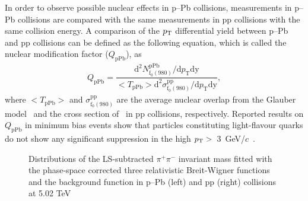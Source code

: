 \documentclass[ALICE,manyauthors]{cernphprep}
\begin{document}
In order to observe possible nuclear effects in p--Pb collisions, measurements in p--Pb collisions are compared with the same measurements in pp collisions with the same collision energy. A comparison of the $p_{\rm{T}}$ differential yield between p--Pb and pp collisions can be defined as the following equation, which is called the nuclear modification factor ($Q_{\mathrm{pPb}}$), as
\begin{eqnarray}
Q_{\mathrm{pPb}} = \dfrac{\mathrm{d}^{2} N_{\mathrm{f}_{0}(980)}^{\mathrm{pPb}} / \mathrm{d} p_{\mathrm{T}} \mathrm{dy} }{ <T_{\mathrm{pPb}}> \mathrm{d}^{2} \sigma_{\mathrm{f}_{0}(980)}^{\mathrm{pp}}/ \mathrm{d} p_{\mathrm{T}} \mathrm{dy} },
\end{eqnarray}
where $<T_{\mathrm{pPb}}>$ and $\sigma_{\mathrm{f}_{0}(980)}^{\mathrm{pp}}$ are the average nuclear overlap from the Glauber model~\cite{Miller:2007ri} and the cross section of \fzero~in pp collisions, respectively. Reported results on $Q_{\mathrm{pPb}}$ in minimum bias events show that particles constituting light-flavour quarks do not show any significant suppression in the high $p_{\rm{T}}>$~3~GeV/$c$~\cite{ALICE:2016dei}.

\begin{figure}[!hbt]
	\centering
	\caption{ Distributions of the LS-subtracted $\pi^{+}\pi^{-}$ invariant mass fitted with the phase-space corrected three relativistic Breit-Wigner functions and the background function in p--Pb (left) and pp (right) collisions at 5.02 TeV}
	\label{fig:SigExt}
\end{figure}
\end{document}
